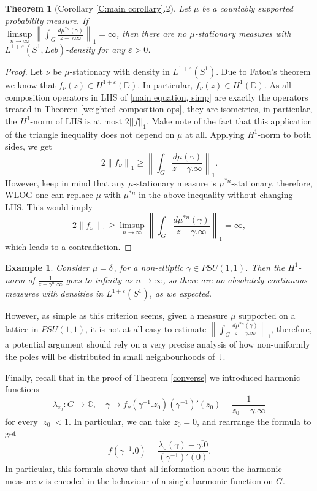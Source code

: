 \documentclass[11pt]{article}
\newtheorem{theorem}{Theorem}[section]
\newtheorem{example}{Example}[section]
\begin{document}
\begin{theorem}[Corollary \ref{C:main corollary}.2]
	Let $\mu$ be a countably supported probability measure. If \\ $\limsup\limits_{n \rightarrow \infty} \left\| \int_G \frac{d \mu^{*n}(\gamma)}{z - \gamma.\infty} \right\|_1 = \infty$, then there are no $\mu$-stationary measures with $L^{1+\varepsilon}(S^1, Leb)$-density for any $\varepsilon > 0$.
\end{theorem}
\begin{proof}
	Let $\nu$ be $\mu$-stationary with density in $L^{1+\varepsilon}(S^1)$. Due to Fatou's theorem we know that $f_\nu(z) \in H^{1 + \varepsilon}(\mathbb{D})$. In particular, $f_\nu(z) \in H^1(\mathbb{D})$. As all composition operators in LHS of \eqref{main equation, simp} are exactly the operators treated in Theorem \ref{weighted composition ops}, they are isometries, in particular, the $H^1$-norm of LHS is at most $2||f||_1$. Make note of the fact that this application of the triangle inequality does not depend on $\mu$ at all. Applying $H^1$-norm to both sides, we get
	\[
	2 \left\| f_\nu \right\|_1 \ge \left\| \int_G \frac{d \mu(\gamma)}{z - \gamma.\infty} \right\|_1.
	\]
	However, keep in mind that any $\mu$-stationary measure is $\mu^{*n}$-stationary, therefore, WLOG one can replace $\mu$ with $\mu^{*n}$ in the above inequality without changing LHS. This would imply
	\[
	2 \left\| f_\nu \right\|_1 \ge \limsup\limits_{n \rightarrow \infty} \left\| \int_G \frac{d \mu^{*n}(\gamma)}{z - \gamma.\infty} \right\|_1 = \infty,
	\]
	which leads to a contradiction.
\end{proof}

\begin{example}
	Consider $\mu = \delta_\gamma$ for a non-elliptic $\gamma \in PSU(1,1)$. Then the $H^1$-norm of $\frac{1}{z - \gamma^n.\infty}$ goes to infinity as $n \rightarrow \infty$, so there are no absolutely continuous measures with densities in $L^{1 + \varepsilon}(S^1)$, as we expected.
\end{example}

However, as simple as this criterion seems, given a measure $\mu$ supported on a lattice in $PSU(1,1)$, it is not at all easy to estimate $\left\| \int_G \frac{d \mu^{*n}(\gamma)}{z - \gamma.\infty} \right\|_1$, therefore, a potential argument should rely on a very precise analysis of how non-uniformly the poles will be distributed in small neighbourhoods of $\mathbb{T}$.

Finally, recall that in the proof of Theorem \ref{converse} we introduced harmonic functions
\[
\lambda_{z_0} : G \rightarrow \mathbb{C}, \quad \gamma \mapsto f_{\nu}(\gamma^{-1}.z_0)(\gamma^{-1})'(z_0) - \frac{1}{z_0 - \gamma.\infty}
\]
for every $|z_0| < 1$. In particular, we can take $z_0 = 0$, and rearrange the formula to get
\[
f(\gamma^{-1}.0) = \dfrac{\lambda_0(\gamma) - \overline{\gamma.0}}{(\gamma^{-1})'(0)}.
\]
In particular, this formula shows that all information about the harmonic measure $\nu$ is encoded in the behaviour of a single harmonic function on $G$. 
\end{document}
